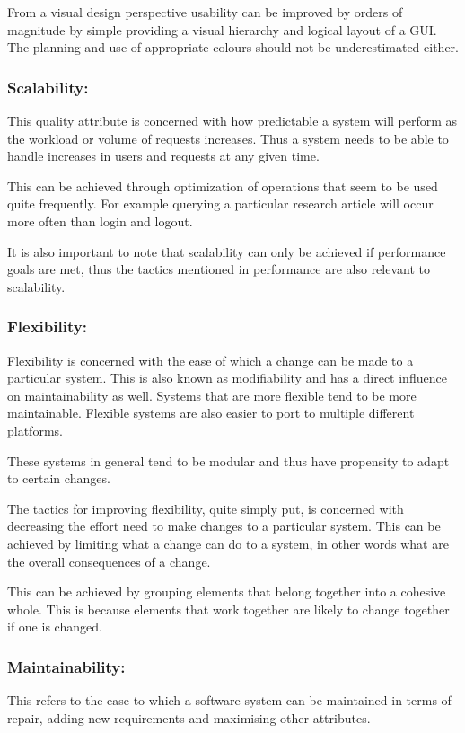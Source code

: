 \documentclass[a4paper,12pt]{article}
\begin{document}
\begin{flushleft}
	From a visual design perspective usability can be improved by orders of magnitude by simple providing a visual hierarchy and logical layout of a GUI. The planning and use of appropriate colours should not be underestimated either.
			
	\subsubsection{Scalability:}
	This quality attribute is concerned with how predictable a system will perform as the workload or volume of requests increases. Thus a system needs to be able to handle increases in users and requests at any given time.
	
	This can be achieved through optimization of operations that seem to be used quite frequently. For example querying a particular research article will occur more often than login and logout. 
	
	It is also important to note that scalability can only be achieved if performance goals are met, thus the tactics mentioned in performance are also relevant to scalability. 
	
	\subsubsection{Flexibility:}
	Flexibility is concerned with the ease of which a change can be made to a particular system. This is also known as modifiability and has a direct influence on maintainability as well. Systems that are more flexible tend to be more maintainable. Flexible systems are also easier to port to multiple different platforms.
	
	These systems in general tend to be modular and thus have propensity to adapt to certain changes.
	
	The tactics for improving flexibility, quite simply put, is concerned with decreasing the effort need to make changes to a particular system. This can be achieved by limiting what a change can do to a system, in other words what are the overall consequences of a change. 
	
	This can be achieved by grouping elements that belong together into a cohesive whole. This is because elements that work together are likely to change together if one is changed.
	
	\subsubsection{Maintainability:}
	This refers to the ease to which a software system can be maintained in terms of repair, adding new requirements and maximising other attributes.
	

\end{flushleft}
\end{document}
